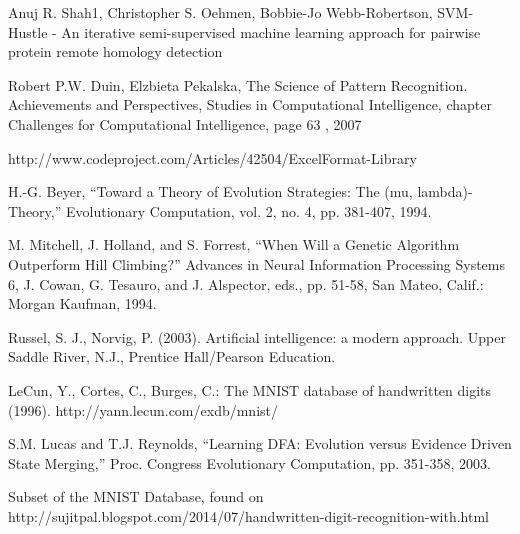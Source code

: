 \documentclass{mini}
\begin{document}
\begin{thebibliography}{1}
	
	 Anuj R. Shah1, Christopher S. Oehmen, Bobbie-Jo Webb-Robertson, SVM-Hustle - An iterative semi-supervised machine learning approach for pairwise protein remote homology detection 
    
	 Robert P.W. Duin, Elzbieta Pekalska, The Science of Pattern Recognition. Achievements and Perspectives, Studies in Computational Intelligence, chapter Challenges for Computational Intelligence, page 63 , 2007
    
     http://www.codeproject.com/Articles/42504/ExcelFormat-Library
	
     H.-G. Beyer, “Toward a Theory of Evolution Strategies: The (mu, lambda)-Theory,” Evolutionary Computation, vol. 2, no. 4, pp. 381-407, 1994.
    
     M. Mitchell, J. Holland, and S. Forrest, “When Will a Genetic Algorithm Outperform Hill Climbing?” Advances in Neural Information Processing Systems 6, J. Cowan, G. Tesauro, and J. Alspector,
    eds., pp. 51-58, San Mateo, Calif.: Morgan Kaufman, 1994.
    
     Russel, S. J., Norvig, P. (2003). Artificial intelligence: a modern approach. Upper Saddle River, N.J., Prentice Hall/Pearson Education.
    
    LeCun, Y., Cortes, C., Burges, C.: The MNIST database of handwritten digits (1996). http://yann.lecun.com/exdb/mnist/
    
    S.M. Lucas and T.J. Reynolds, “Learning DFA: Evolution versus Evidence Driven State Merging,” Proc. Congress Evolutionary Computation, pp. 351-358, 2003.
    
     Subset of the MNIST Database, found on http://sujitpal.blogspot.com/2014/07/handwritten-digit-recognition-with.html

\end{thebibliography}

\makestatement
\end{document}
